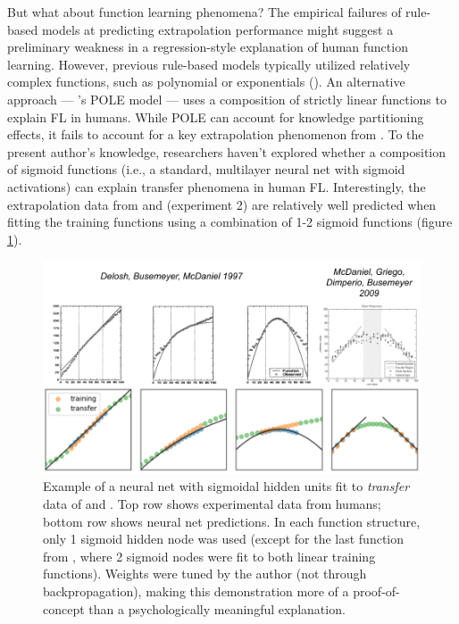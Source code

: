\documentclass[12pt]{article}
\let\oldcite=\cite
\let\oldtextcite=\textcite
\renewcommand{\cite}[1]{\textcolor[rgb]{0, .121, .388}{\oldcite{#1}}}
\renewcommand{\textcite}[1]{\textcolor[rgb]{0, .121, .388}{\oldtextcite{#1}}}
\begin{document}

But what about function learning phenomena? The empirical failures of rule-based models at predicting extrapolation performance might suggest a preliminary weakness in a regression-style explanation of human function learning. However, previous rule-based models typically utilized relatively complex functions, such as polynomial or exponentials (\cite{brehmer1974hypotheses}). An alternative  approach --- \textcite{kalish2004population}'s POLE model --- uses a composition of strictly linear functions to explain FL in humans. While POLE can account for knowledge partitioning effects, it fails to account for a key extrapolation phenomenon from \textcite{mcdaniel2009predicting}. To the present author's knowledge, researchers haven't explored whether a composition of sigmoid functions (i.e., a standard, multilayer neural net with sigmoid activations) can explain transfer phenomena in human FL. Interestingly, the extrapolation data from \textcite{delosh1997extrapolation} and \textcite{mcdaniel2009predicting} (experiment 2) are relatively well predicted when fitting the training functions using a combination of 1-2 sigmoid functions (figure \ref{fig:sigFit}).

\begin{figure}[H]
    \centering
    \includegraphics[scale=.4]{figures/sigFit.png}
    \caption{Example of a neural net with sigmoidal hidden units fit to \emph{transfer} data of \textcite{delosh1997extrapolation} and \textcite{mcdaniel2009predicting}. Top row shows experimental data from humans; bottom row shows neural net predictions. In each function structure, only 1 sigmoid hidden node was used (except for the last function from \textcite{mcdaniel2009predicting}, where 2 sigmoid nodes were fit to both linear training functions). Weights were tuned by the author (not through backpropagation), making this demonstration more of a proof-of-concept than a psychologically meaningful explanation.}
    \label{fig:sigFit}
\end{figure} 
\end{document}
